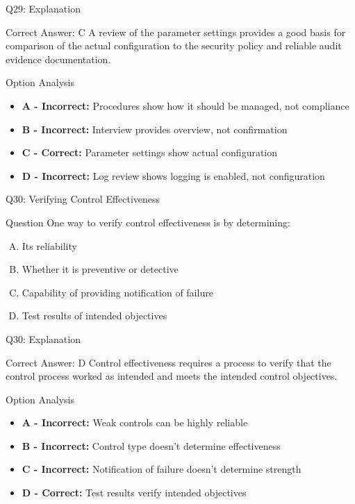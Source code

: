 \documentclass{beamer}
\begin{document}
	\begin{frame}{Q29: Explanation}
		\begin{block}{Correct Answer: C}
			A review of the parameter settings provides a good basis for comparison of the actual configuration to the security policy and reliable audit evidence documentation.
		\end{block}
		\begin{block}{Option Analysis}
			\begin{itemize}
				\item \textbf{A - Incorrect:} Procedures show how it should be managed, not compliance
				\item \textbf{B - Incorrect:} Interview provides overview, not confirmation
				\item \textbf{C - Correct:} Parameter settings show actual configuration
				\item \textbf{D - Incorrect:} Log review shows logging is enabled, not configuration
			\end{itemize}
		\end{block}
	\end{frame}
	
	\begin{frame}{Q30: Verifying Control Effectiveness}
		\begin{block}{Question}
			One way to verify control effectiveness is by determining:
		\end{block}
		\begin{enumerate}[(A)]
			\item Its reliability
			\item Whether it is preventive or detective
			\item Capability of providing notification of failure
			\item Test results of intended objectives
		\end{enumerate}
	\end{frame}
	
	\begin{frame}{Q30: Explanation}
		\begin{block}{Correct Answer: D}
			Control effectiveness requires a process to verify that the control process worked as intended and meets the intended control objectives.
		\end{block}
		\begin{block}{Option Analysis}
			\begin{itemize}
				\item \textbf{A - Incorrect:} Weak controls can be highly reliable
				\item \textbf{B - Incorrect:} Control type doesn't determine effectiveness
				\item \textbf{C - Incorrect:} Notification of failure doesn't determine strength
				\item \textbf{D - Correct:} Test results verify intended objectives
			\end{itemize}
		\end{block}
	\end{frame}
	
\end{document}
